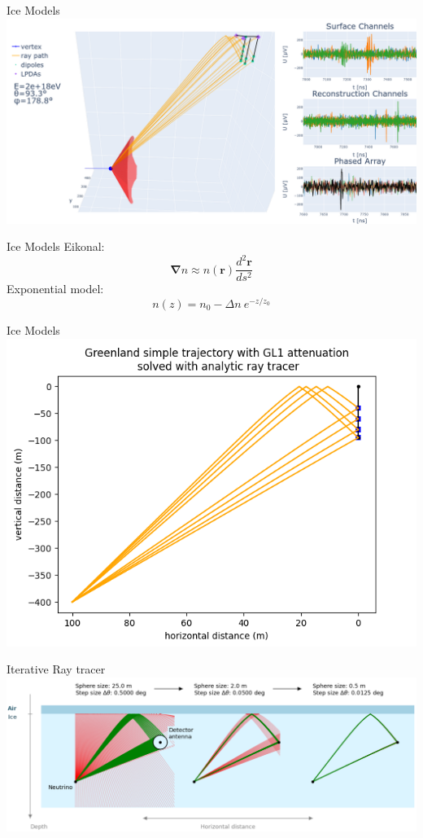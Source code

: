 \documentclass{beamer}
\begin{document}
\begin{frame}{Ice Models}
  \centering
  \includegraphics[width=\textwidth]{figures/mechanism.png}
\end{frame}
\begin{frame}{Ice Models}
Eikonal:
  \begin{equation}
    \mathbf{\nabla} n \approx n(\mathbf{r})\frac{d^2\mathbf{r}}{ds^2}
  \end{equation}
Exponential model:
  \begin{equation}
    n(z) = n_0 - \Delta n \ e^{-z/z_0}
  \end{equation}
\end{frame}
\begin{frame}{Ice Models}
  \centering
  \includegraphics[width=\textwidth]{figures/detector-illustration.png}
\end{frame}
\begin{frame}{Iterative Ray tracer}
  \centering
  \includegraphics[width=\textwidth]{figures/iterative_explanation.png}
\end{frame}
\end{document}

